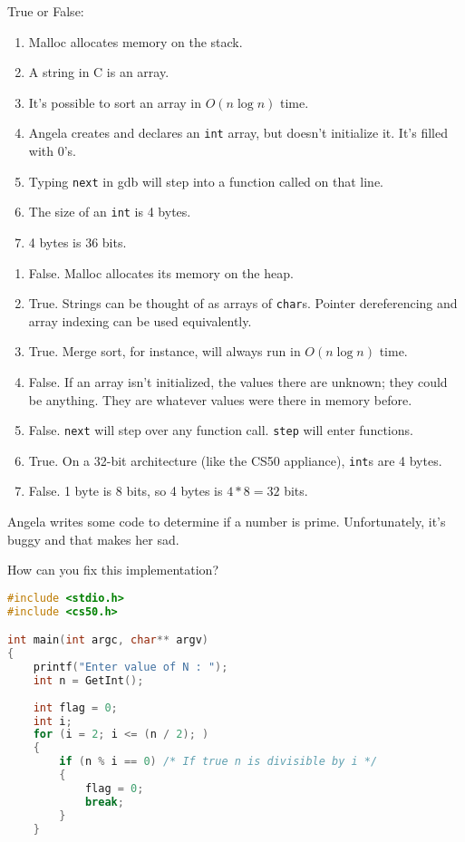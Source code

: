 \documentclass[12pt]{exam}
\begin{document}
\begin{questions}
\question
True or False:
\begin{enumerate}
\item Malloc allocates memory on the stack.
\item A string in C is an array.
\item It's possible to sort an array in $O(n \log{n})$ time.
\item Angela creates and declares an {\tt int} array, but doesn't initialize it. It's filled with 0's.
\item Typing {\tt next} in gdb will step into a function called on that line.
\item The size of an {\tt int} is 4 bytes.
\item 4 bytes is 36 bits.
\end{enumerate}

\hrulefill

\begin{enumerate}
\item False.
Malloc allocates its memory on the heap.
\item True.
Strings can be thought of as arrays of {\tt char}s.
Pointer dereferencing and array indexing can be used equivalently.
\item True.
Merge sort, for instance, will always run in $O(n \log{n})$ time.
\item False.
If an array isn't initialized, the values there are unknown;
they could be anything.
They are whatever values were there in memory before.
\item False.
{\tt next} will step over any function call.
{\tt step} will enter functions.
\item True.
On a 32-bit architecture (like the CS50 appliance), {\tt int}s are 4 bytes.
\item False.
1 byte is 8 bits, so 4 bytes is $4 * 8 = 32$ bits.
\end{enumerate}

\question
Angela writes some code to determine if a number is prime. Unfortunately, it's buggy and that makes her sad.

How can you fix this implementation?

\begin{lstlisting}[language=c, mathescape]
#include <stdio.h>
#include <cs50.h>

int main(int argc, char** argv) 
{
    printf("Enter value of N : ");
    int n = GetInt();
  
    int flag = 0;
    int i;
    for (i = 2; i <= (n / 2); ) 
    { 
        if (n % i == 0) /* If true n is divisible by i */
        {
            flag = 0;
            break;
        }
    }
 

\end{lstlisting}
\end{questions}
\end{document}
